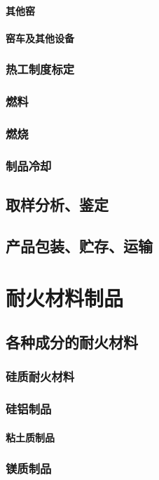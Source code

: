 \documentclass[UTF8]{../../ApplicationUniverse}
\begin{document}
            \paragraph{其他窑}
            \paragraph{窑车及其他设备}
        \subsubsection{热工制度标定}
        \subsubsection{燃料}
        \subsubsection{燃烧}
        \subsubsection{制品冷却}
    \subsection{取样分析、鉴定}
    \subsection{产品包装、贮存、运输}
\section{耐火材料制品}
    \subsection{各种成分的耐火材料}
        \subsubsection{硅质耐火材料}
        \subsubsection{硅铝制品}
            \paragraph{粘土质制品}
        \subsubsection{镁质制品}
\end{document}
